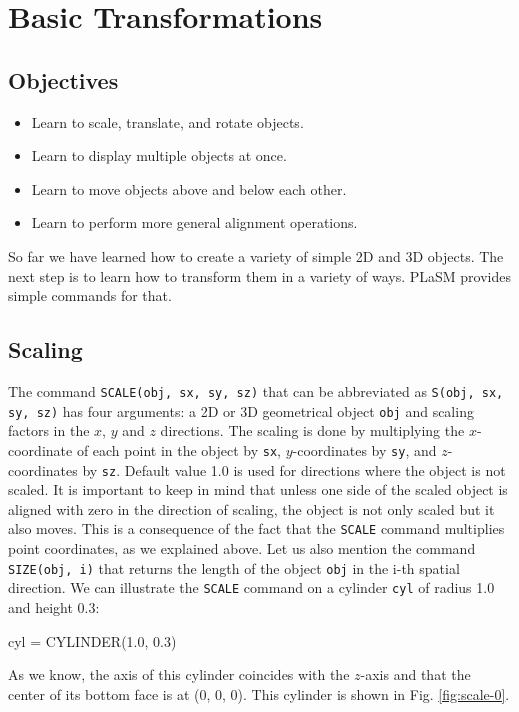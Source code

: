 \section{Basic Transformations}

\subsection{Objectives}
\begin{itemize}
\item Learn to scale, translate, and rotate objects.
\item Learn to display multiple objects at once.
\item Learn to move objects above and below each other.
\item Learn to perform more general alignment operations.
\end{itemize}
So far we have learned how to create a variety of simple 2D and 3D objects. 
The next step is to learn how to transform them in a variety of ways. PLaSM
provides simple commands for that. 

\subsection{Scaling}

The command {\tt SCALE(obj, sx, sy, sz)} that can be abbreviated as 
{\tt S(obj, sx, sy, sz)} has four arguments: a 2D or 3D geometrical object {\tt obj} 
and scaling factors in the $x$, $y$ and $z$ directions. The scaling is done by
multiplying the $x$-coordinate of each point in the object by {\tt sx}, $y$-coordinates
by {\tt sy}, and $z$-coordinates by {\tt sz}. Default value 1.0 is used for directions where 
the object is not scaled. It is important to keep in mind that unless 
one side of the scaled object is aligned with zero in the direction of scaling, 
the object is not only scaled but it also moves. This is a consequence of the 
fact that the {\tt SCALE} command multiplies point coordinates, as we explained above. 
Let us also mention the command {\tt SIZE(obj, i)} that returns the length of 
the object {\tt obj} in the i-th spatial direction.
We can illustrate the {\tt SCALE} command on a cylinder {\tt cyl} of radius 1.0 
and height 0.3:

\begin{bluecode}
cyl = CYLINDER(1.0, 0.3)
\end{bluecode}
As we know, the axis of this cylinder coincides with the $z$-axis 
and that the center of its bottom face is at (0, 0, 0). This cylinder is shown 
in Fig. \ref{fig:scale-0}.

